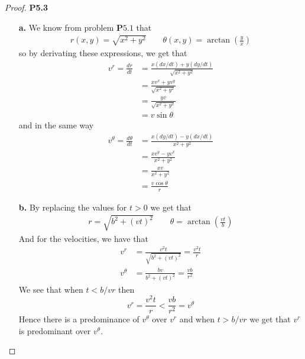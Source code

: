 \documentclass[11pt]{article}
\theoremstyle{definition}
\begin{document}
\begin{proof}{\textbf{P5.3}}
\begin{itemize}
    \item[\bf{a.}] We know from problem $\bm{P5.1}$ that
    \begin{align*}
        r(x, y) = \sqrt{x^2 + y^2} \quad\quad
        \theta(x, y) = \arctan\left(\frac{y}{x}\right)
    \end{align*}
    so by derivating these expressions, we get that
    \begin{align*}
        v^r = \frac{dr}{dt} &= \frac{x(dx/dt) + y(dy/dt)}{\sqrt{x^2 + y^2}}\\
        &= \frac{xv^x + yv^y}{\sqrt{x^2 + y^2}}\\
        &= \frac{yv}{\sqrt{x^2 + y^2}}\\
        &= v\sin\theta
    \end{align*}
    and in the same way
    \begin{align*}
        v^\theta = \frac{d\theta}{dt} &= \frac{x(dy/dt) - y(dx/dt)}{x^2 + y^2}\\
        &= \frac{xv^y - yv^x}{x^2 + y^2}\\
        &= \frac{xv}{x^2 + y^2}\\
        &= \frac{v\cos\theta}{r}
    \end{align*}
    \item[\bf{b.}] By replacing the values for $t > 0$ we get that
    \begin{align*}
        r = \sqrt{b^2 + (vt)^2} \quad\quad
        \theta = \arctan\left(\frac{vt}{b}\right)
    \end{align*}
    And for the velocities, we have that
    \begin{align*}
        v^r &= \frac{v^2t}{\sqrt{b^2 + (vt)^2}} = \frac{v^2t}{r}\\
        v^\theta &= \frac{bv}{b^2 + (vt)^2} = \frac{vb}{r^2}
    \end{align*}
    We see that when $t < b/vr$ then
    $$v^r = \frac{v^2t}{r} < \frac{vb}{r^2} = v^\theta$$
    Hence there is a predominance of $v^\theta$ over $v^r$ and when $t > b/vr$
    we get that $v^r$ is predominant over $v^\theta$.
\end{itemize}
\end{proof}
\cleardoublepage
\end{document}
